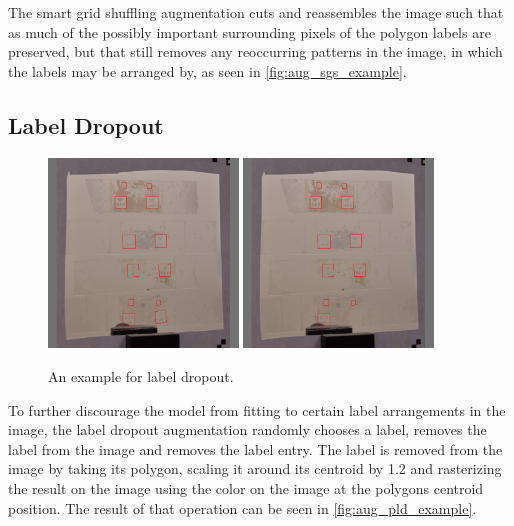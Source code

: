 \documentclass[10pt]{book}
\newcommand{\figureref}[1]{\autoref{#1}}
\begin{document}
The smart grid shuffling augmentation cuts and reassembles the image such that as much of the possibly important surrounding pixels of the polygon labels are preserved, but that still removes any reoccurring patterns in the image, in which the labels may be arranged by, as seen in \figureref{fig:aug_sgs_example}.

\subsection{Label Dropout}
\label{sec:aug_ld}

\begin{figure}
  \centering
     {\includegraphics[width=0.45\textwidth]{image/aug_pld_before}}
     {\includegraphics[width=0.45\textwidth]{image/aug_pld_after}}
  \caption{An example for label dropout.}
  \label{fig:aug_pld_example}
\end{figure}

To further discourage the model from fitting to certain label arrangements in the image, the label dropout augmentation randomly chooses a label, removes the label from the image and removes the label entry. The label is removed from the image by taking its polygon, scaling it around its centroid by 1.2 and rasterizing the result on the image using the color on the image at the polygons centroid position. The result of that operation can be seen in \figureref{fig:aug_pld_example}.
\end{document}
